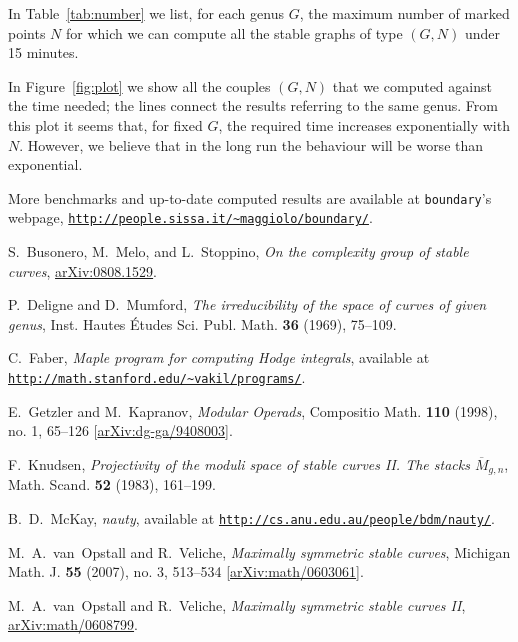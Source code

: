 \documentclass{amsart}
\newcommand{\arXiv}[1]{\href{http://arxiv.org/abs/#1}{arXiv:#1}}
\theoremstyle{plain}
\theoremstyle{definition}
\begin{document}
In Table~\ref{tab:number} we list, for each genus $G$, the maximum
number of marked points $N$ for which we can compute all the stable
graphs of type $(G, N)$ under 15 minutes.

In Figure~\ref{fig:plot} we show all the couples $(G, N)$ that we
computed against the time needed; the lines connect the results
referring to the same genus. From this plot it seems that, for fixed
$G$, the required time increases exponentially with $N$. However, we
believe that in the long run the behaviour will be worse than
exponential.

More benchmarks and up-to-date computed results are available
at \texttt{boundary}'s webpage,
\href{http://people.sissa.it/~maggiolo/boundary/}
{\texttt{http://people.sissa.it/\~{}maggiolo/boundary/}}.

\begin{thebibliography}{2}

  S.~Busonero, M.~Melo, and L.~Stoppino,
  \emph{On the complexity group of stable curves},
  \arXiv{0808.1529}.%

  P.~Deligne and D.~Mumford,
  \emph{The irreducibility of the space of curves of given genus},
  Inst. Hautes \'Etudes Sci. Publ. Math. \textbf{36} (1969), 75--109.

  C.~Faber,
  \emph{Maple program for computing Hodge integrals},
  available at \href{http://math.stanford.edu/~vakil/programs/}
  {\texttt{http://math.stanford.edu/\~{}vakil/programs/}}.

  E.~Getzler and M.~Kapranov,
  \emph{Modular Operads},
  Compositio Math. \textbf{110} (1998), no. 1, 65--126
  [\arXiv{dg-ga/9408003}].

   F.~Knudsen,
  \emph{Projectivity of the moduli space of stable curves II. The stacks $\overline{M}_{g,n}$}, Math. Scand. \textbf{52} (1983), 161--199.

  B.~D.~McKay,
  \emph{nauty},
  available at \href{http://cs.anu.edu.au/people/bdm/nauty/}
  {\texttt{http://cs.anu.edu.au/people/bdm/nauty/}}.

  M.~A.~van~Opstall and R.~Veliche,
  \emph{Maximally symmetric stable curves},
  Michigan Math. J. \textbf{55} (2007), no. 3, 513--534
  [\arXiv{math/0603061}].

  M.~A.~van~Opstall and R.~Veliche,
  \emph{Maximally symmetric stable curves II},
  \arXiv{math/0608799}.%


\end{thebibliography}
\end{document}
